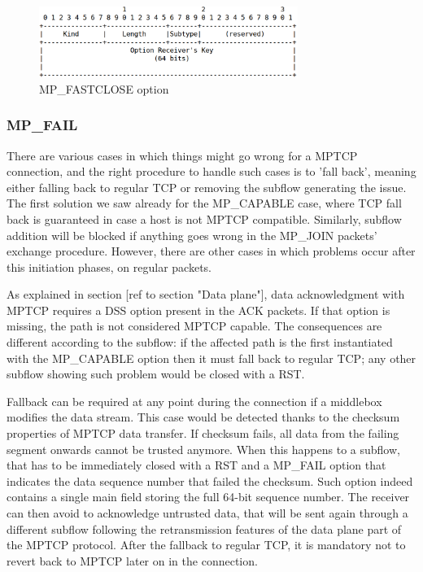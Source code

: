 \begin{figure}[!htb]
\centering
\includegraphics[width=0.75\textwidth]{images/opt_fastclose}
\caption{MP\_FASTCLOSE option}
\label{fig:opt_fastclose}
\end{figure}

\subsubsection{MP\_FAIL}
There are various cases in which things might go wrong for a MPTCP connection, and the right procedure to handle such cases is to 'fall back', meaning either falling back to regular TCP or removing the subflow generating the issue. The first solution we saw already for the MP\_CAPABLE case, where TCP fall back is guaranteed in case a host is not MPTCP compatible. Similarly, subflow addition will be blocked if anything goes wrong in the MP\_JOIN packets' exchange procedure. However, there are other cases in which problems occur after this initiation phases, on regular packets.


As explained in section [ref to section "Data plane"], data acknowledgment with MPTCP requires a DSS option present in the ACK packets. If that option is missing, the path is not considered MPTCP capable. The consequences are different according to the subflow: if the affected path is the first instantiated with the MP\_CAPABLE option then it must fall back to regular TCP; any other subflow showing such problem would be closed with a RST. 


Fallback can be required at any point during the connection if a middlebox modifies the data stream. This case would be detected thanks to the checksum properties of MPTCP data transfer. If checksum fails, all data from the failing segment onwards cannot be trusted anymore. When this happens to a subflow, that has to be immediately closed with a RST and a MP\_FAIL option that indicates the data sequence number that failed the checksum. Such option indeed contains a single main field storing the full 64-bit sequence number. The receiver can then avoid to acknowledge untrusted data, that will be sent again through a different subflow following the retransmission features of the data plane part of the MPTCP protocol. After the fallback to regular TCP, it is mandatory not to revert back to MPTCP later on in the connection.


